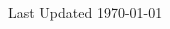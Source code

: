 \documentclass[letterpaper, 10.5pt,landscape]{article}
\makeatletter
\renewcommand{\section}{\@startsection{section}{1}{0mm}%
                                {-1ex plus -.5ex minus -.2ex}%
                                {0.1ex plus .2ex}%
                                {\normalfont\small}}
\renewcommand{\subsection}{\@startsection{subsection}{2}{0mm}%
                                {-1explus -.5ex minus -.2ex}%
                                {0.5ex plus .2ex}%
                                {\normalfont\normalsize\bfseries}}
\makeatother
\begin{document}
\begin{multicols*}{3}






\vspace*{\fill}








\begin{center}
    Last Updated \today
\end{center}






























\end{multicols*}

% 
\end{document}
